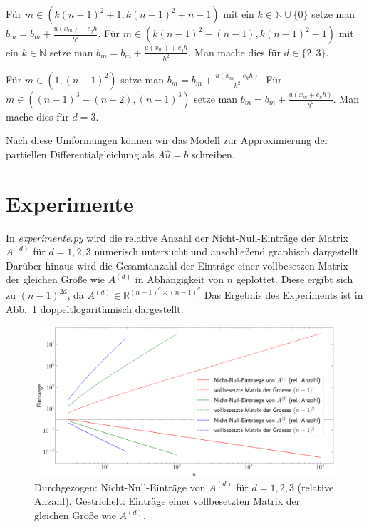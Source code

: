 \documentclass[smallheadings]{scrartcl}
\begin{document}
Für $m \in (k(n-1)^2+1, k(n-1)^2+n-1)$ mit ein $k \in \mathbb{N}\cup \{0\}$ setze man $b_m = b_m + \frac{u(x_m)-e_jh}{h^2}$. Für $m \in (k(n-1)^2-(n-1), k(n-1)^2-1)$ mit ein $k \in \mathbb{N}$ setze man $b_m = b_m + \frac{u(x_m)+e_jh}{h^2}$.  Man mache dies für $d\in \{2, 3\}$.

Für $m\in (1, (n-1)^2)$ setze man $b_m = b_m + \frac{u(x_m-e_kh)}{h^2}$. Für $m\in ((n-1)^3-(n-2), (n-1)^3)$ setze man $b_m = b_m + \frac{u(x_m+e_kh)}{h^2}$.  Man mache dies für $d=3$.

Nach diese Umformungen können wir das Modell zur Approximierung der partiellen Differentialgleichung als $A\hat{u}=b$ schreiben.

\section{Experimente}

In \textit{experimente.py} wird die relative Anzahl der Nicht-Null-Einträge der Matrix $A^{(d)}$ für $d=1,2,3$ numerisch untersucht und anschließend graphisch dargestellt. Darüber hinaus wird die Gesamtanzahl der Einträge einer vollbesetzen Matrix der gleichen Größe wie $A^{(d)}$ in Abhängigkeit von $n$ geplottet. Diese ergibt sich zu $(n-1)^{2d}$, da $A^{(d)}\in\mathbb{R}^{(n-1)^d\times(n-1)^d}$ Das Ergebnis des Experiments ist in Abb.~\ref{im:nn_eintr} doppeltlogarithmisch dargestellt.

\begin{figure}[H]
\includegraphics[width=\textwidth]{Bilder/nn_eintraege}

\caption{Durchgezogen: Nicht-Null-Einträge von $A^{(d)}$ für $d=1,2,3$ (relative Anzahl). Gestrichelt: Einträge einer vollbesetzten Matrix der gleichen Größe wie $A^{(d)}$.}
\label{im:nn_eintr}
\end{figure}
\end{document}
